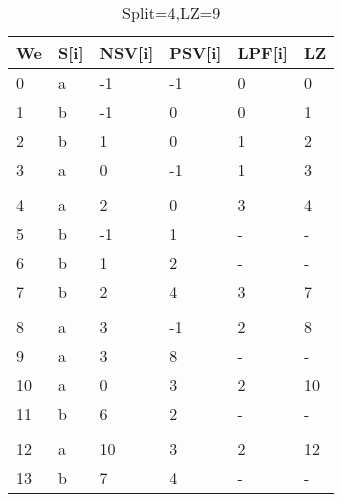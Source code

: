\begin{table}[h]
\centering
\begin{tabular}{@{}llllll@{}}
\toprule
We  & S{[}i{]} & NSV{[}i{]} & PSV{[}i{]} & LPF{[}i{]} & LZ \\ \midrule
0  & a        & -1         & -1         & 0          & 0  \\
1  & b        & -1         & 0          & 0          & 1  \\
2  & b        & 1          & 0          & 1          & 2  \\
3  & a        & 0          & -1         & 1          & 3  \\
   &          &            &            &            &    \\
4  & a        & 2          & 0          & 3          & 4  \\
5  & b        & -1         & 1          & -          & -  \\
6  & b        & 1          & 2          & -          & -  \\
7  & b        & 2          & 4          & 3          & 7  \\
   &          &            &            &            &    \\
8  & a        & 3          & -1         & 2          & 8  \\
9  & a        & 3          & 8          & -          & -  \\
10 & a        & 0          & 3          & 2          & 10 \\
11 & b        & 6          & 2          & -          & -  \\
   &          &            &            &            &    \\
12 & a        & 10         & 3          & 2          & 12 \\
13 & b        & 7          & 4          & -          & -  \\ \bottomrule
\end{tabular}
\caption{Split=4,LZ=9}
\label{tab:example4}
\end{table}

